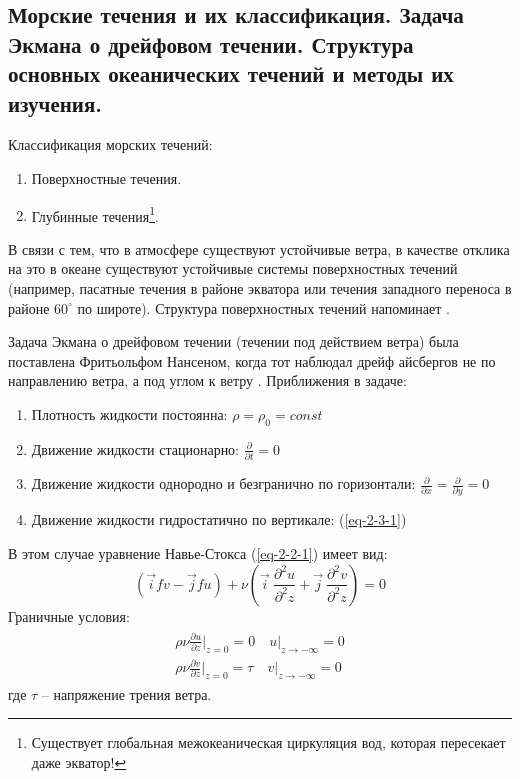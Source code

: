 \subsection{Морские течения и их классификация. Задача Экмана о дрейфовом течении. Структура основных океанических течений и методы их изучения.}
Классификация морских течений:
\begin{enumerate}
\item Поверхностные течения.
\item Глубинные течения\footnote{Существует глобальная межокеаническая циркуляция вод, которая пересекает даже экватор!}.
\end{enumerate}

В связи с тем, что в атмосфере существуют устойчивые ветра, в качестве отклика на это в океане существуют устойчивые системы поверхностных течений (например, пасатные течения в районе экватора или течения западного переноса в районе $60^\circ$ по широте).
Структура поверхностных течений напоминает .

Задача Экмана о дрейфовом течении (течении под действием ветра) была поставлена Фритьольфом Нансеном, когда тот наблюдал дрейф айсбергов не по направлению ветра, а под углом к ветру \cite{Носов-2019-7}.
Приближения в задаче:
\begin{enumerate}
\item Плотность жидкости постоянна: $\rho=\rho_0=const$
\item Движение жидкости стационарно: $\frac{\partial}{\partial t}=0$
\item Движение жидкости однородно и безгранично по горизонтали: $\frac{\partial}{\partial x}=\frac{\partial}{\partial y}=0$
\item Движение жидкости гидростатично по вертикале: (\ref{eq-2-3-1})
\end{enumerate}

В этом случае уравнение Навье-Стокса (\ref{eq-2-2-1}) имеет вид:
\begin{equation}\label{eq-3-8-1}
(\vec{i}fv-\vec{j}fu)+\nu\left(\vec{i}\:\frac{\partial^2u}{\partial^2z}+\vec{j}\:\frac{\partial^2v}{\partial^2z}\right)=0
\end{equation}
Граничные условия:
\begin{align}
\begin{split}
\rho\nu\frac{\partial u}{\partial z}\biggr\rvert_{z=0}=0\quad u\rvert_{z\rightarrow -\infty}=0
\\
\rho\nu\frac{\partial v}{\partial z}\biggr\rvert_{z=0}=\tau\quad v\rvert_{z\rightarrow -\infty}=0
\end{split}
\end{align}
где $\tau$ -- напряжение трения ветра.

